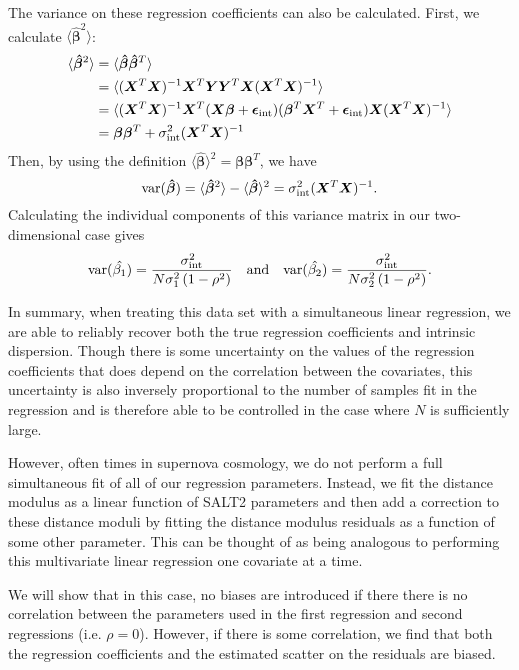 The variance on these regression coefficients can also be calculated. First, we calculate $\langle\bm{\hat{\beta}}^2\rangle$:
\begin{align*}
    \langle\bm{\hat{\beta}}^2\rangle &= \langle\bm{\hat{\beta}}\bm{\hat{\beta}}^T\rangle \\
    &= \langle(\bm{X}^T\bm{X})^{-1}\bm{X}^T\bm{YY}^T\bm{X}(\bm{X}^T\bm{X})^{-1}\rangle \\
    &= \langle(\bm{X}^T\bm{X})^{-1}\bm{X}^T(\bm{X\beta}+\bm{\epsilon}_\text{int})(\bm{\beta}^T\bm{X}^T+\bm{\epsilon}_\text{int})\bm{X}(\bm{X}^T\bm{X})^{-1}\rangle\\
    &= \bm{\beta\beta}^T + \sigma_{\text{int}}^2(\bm{X}^T\bm{X})^{-1}
\end{align*}
Then, by using the definition $\langle\bm{\hat{\beta}}\rangle^2 = \bm{\beta\beta}^T$, we have$$\text{var}(\bm{\hat{\beta}})= \langle\bm{\hat{\beta}}^2\rangle-\langle\bm{\hat{\beta}}\rangle^2 = \sigma_{\text{int}}^2(\bm{X}^T\bm{X})^{-1}.$$
Calculating the individual components of this variance matrix in our two-dimensional case gives
$$\text{var}(\hat{\beta_1})=\frac{\sigma_{\text{int}}^2}{N\sigma_1^2\left(1-\rho^2\right)}\quad\text{and}\quad\text{var}(\hat{\beta_2})=\frac{\sigma_{\text{int}}^2}{N\sigma_2^2\left(1-\rho^2\right)}.$$

In summary, when treating this data set with a simultaneous linear regression, we are able to reliably recover both the true regression coefficients and intrinsic dispersion. Though there is some uncertainty on the values of the regression coefficients that does depend on the correlation between the covariates, this uncertainty is also inversely proportional to the number of samples fit in the regression and is therefore able to be controlled in the case where $N$ is sufficiently large.

However, often times in supernova cosmology, we do not perform a full simultaneous fit of all of our regression parameters. Instead, we fit the distance modulus as a linear function of SALT2 parameters and then add a correction to these distance moduli by fitting the distance modulus residuals as a function of some other parameter. This can be thought of as being analogous to performing this multivariate linear regression one covariate at a time.

We will show that in this case, no biases are introduced if there there is no correlation between the parameters used in the first regression and second regressions (i.e. $\rho=0$). However, if there is some correlation, we find that both the regression coefficients and the estimated scatter on the residuals are biased.

